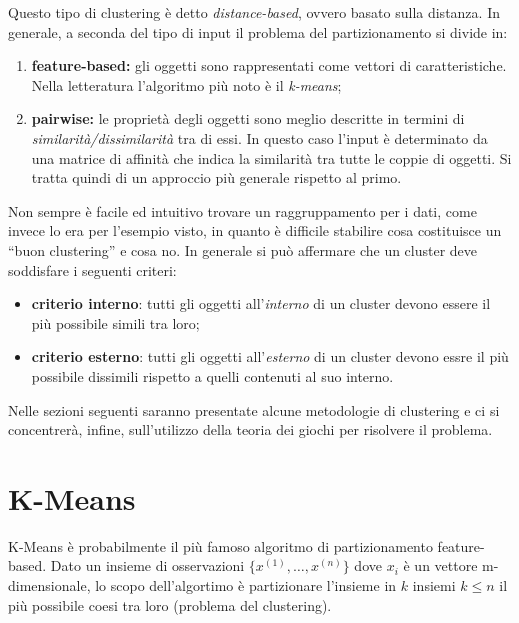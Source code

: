 \newpage

Questo tipo di clustering è detto \emph{distance-based}, ovvero basato sulla distanza. In generale, a seconda del tipo di input il problema del partizionamento si divide in:
\begin{enumerate}
	\item \textbf{feature-based:} gli oggetti sono rappresentati come vettori di caratteristiche. Nella letteratura l'algoritmo più noto è il \emph{k-means};
	\item \textbf{pairwise:} le proprietà degli oggetti sono meglio descritte in termini di \emph{similarità/dissimilarità} tra di essi. In questo caso l'input è determinato da una matrice di affinità che indica la similarità tra tutte le coppie di oggetti. Si tratta quindi di un approccio più generale rispetto al primo.
\end{enumerate}

Non sempre è facile ed intuitivo trovare un raggruppamento per i dati, come invece lo era per l’esempio visto, in quanto è difficile stabilire cosa costituisce un “buon clustering” e cosa no. In generale si può affermare che un cluster deve soddisfare i seguenti criteri:
\begin{itemize}
	\item \textbf{criterio interno}: tutti gli oggetti all'\emph{interno} di un cluster devono essere il più possibile simili tra loro;
	\item \textbf{criterio esterno}: tutti gli oggetti all'\emph{esterno} di un cluster devono essre il più possibile dissimili rispetto a quelli contenuti al suo interno.
\end{itemize}

Nelle sezioni seguenti saranno presentate alcune metodologie di clustering e ci si concentrerà, infine, sull'utilizzo della teoria dei giochi per risolvere il problema.


\newpage

\section{K-Means} %
\label{sec:k_means}
K-Means è probabilmente il più famoso algoritmo di partizionamento feature-based. Dato un insieme di osservazioni $\{x^{(1)},\dots,x^{(n)} \}$ dove $x_i$ è un vettore m-dimensionale, lo scopo dell'algortimo è partizionare l'insieme in $k$ insiemi $k \leq n$ il più possibile coesi tra loro (problema del clustering).\\

